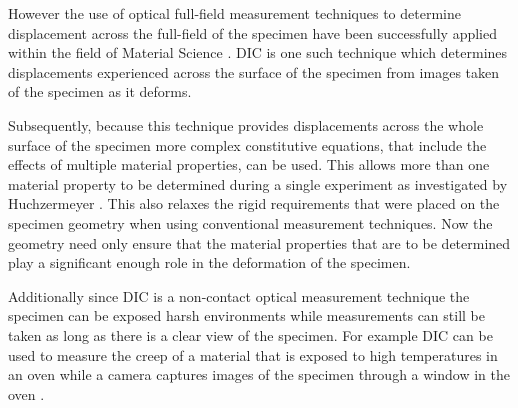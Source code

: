 \documentclass[12pt,oneside,openany,a4paper, %
english, %
masters-t, goldenblock]{usthesis}
\begin{document}
However the use of optical full-field measurement techniques to determine displacement across the full-field of the specimen have been successfully applied within the field of Material Science \cite{chiang2008micro,chevalier2001digital}. DIC is one such technique which determines displacements experienced across the surface of the specimen from images taken of the specimen as it deforms.

Subsequently, because this technique provides displacements across the whole surface of the specimen more complex constitutive equations, that include the effects of multiple material properties, can be used. This allows more than one material property to be determined during a single experiment as investigated by Huchzermeyer \cite{huchzermeyer2017measuring}. This also relaxes the rigid requirements that were placed on the specimen geometry when using conventional measurement techniques. Now the geometry need only ensure that the material properties that are to be determined play a significant enough role in the deformation of the specimen.

Additionally since DIC is a non-contact optical measurement technique the specimen can be exposed harsh environments while measurements can still be taken as long as there is a clear view of the specimen. For example DIC can be used to measure the creep of a material that is exposed to high temperatures in an oven while a camera captures images of the specimen through a window in the oven \cite{van2018high}.




\end{document}
